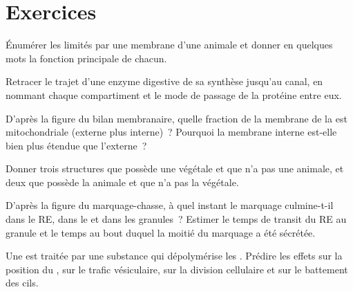\section{Exercices}

\begin{exercise}[$\star$]\label{exo:b1:eukaryotic-cell:1}
Énumérer les  limités par une membrane d'une  animale et
donner en quelques mots la fonction principale de chacun.
\end{exercise}

\begin{exercise}[$\star$]\label{exo:b1:eukaryotic-cell:2}
Retracer le trajet d'une enzyme digestive de sa synthèse jusqu'au
canal, en nommant chaque compartiment et le mode de passage de la
protéine entre eux.
\end{exercise}

\begin{exercise}[$\star$]\label{exo:b1:eukaryotic-cell:3}
D'après la figure du bilan membranaire, quelle fraction de la membrane
de la  est mitochondriale (externe plus interne)~? Pourquoi la
membrane interne est-elle bien plus étendue que l'externe~?
\end{exercise}

\begin{exercise}[$\star$]\label{exo:b1:eukaryotic-cell:4}
Donner trois structures que possède une  végétale et que n'a pas
une  animale, et deux que possède la  animale et que n'a
pas la  végétale.
\end{exercise}

\begin{exercise}[$\star\star$]\label{exo:b1:eukaryotic-cell:5}
D'après la figure du marquage-chasse, à quel instant le marquage
culmine-t-il dans le RE, dans le  et dans les granules~? Estimer le
temps de transit du RE au granule et le temps au bout duquel la moitié
du marquage a été sécrétée.
\end{exercise}

\begin{exercise}[$\star\star$]\label{exo:b1:eukaryotic-cell:6}
Une  est traitée par une substance qui dépolymérise les
. Prédire les effets sur la position du , sur le trafic
vésiculaire, sur la division cellulaire et sur le battement des cils.
\end{exercise}

